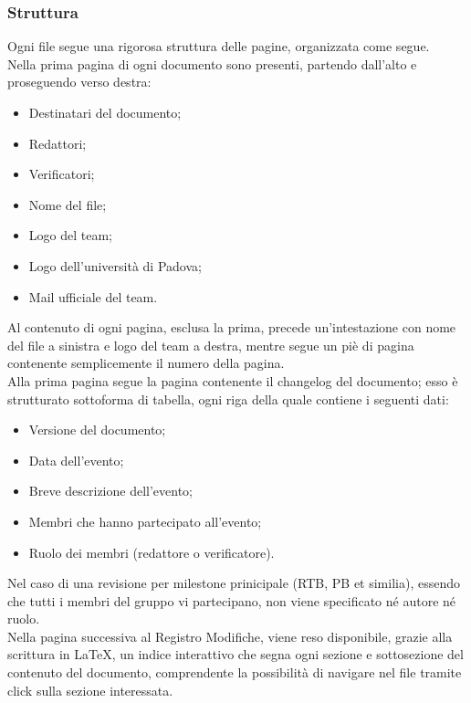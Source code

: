\subsubsection{Struttura}
Ogni file segue una rigorosa struttura delle pagine, organizzata come segue.
\\
Nella prima pagina di ogni documento sono presenti, partendo dall'alto e proseguendo verso destra:
\begin{itemize}
    \item Destinatari del documento;
    \item Redattori;
    \item Verificatori;
    \item Nome del file; 
    \item Logo del team;
    \item Logo dell'università di Padova;
    \item Mail ufficiale del team.
\end{itemize}
Al contenuto di ogni pagina, esclusa la prima, precede un'intestazione con nome del file a sinistra e logo del team a destra, mentre segue un piè di pagina contenente semplicemente il numero della pagina. 
\\
Alla prima pagina segue la pagina contenente il changelog del documento; esso è strutturato sottoforma di tabella, ogni riga della quale contiene i seguenti dati:
\begin{itemize}
    \item Versione del documento;
    \item Data dell'evento;
    \item Breve descrizione dell'evento;
    \item Membri che hanno partecipato all'evento;
    \item Ruolo dei membri (redattore o verificatore).
\end{itemize}
Nel caso di una revisione per milestone prinicipale (RTB, PB et similia), essendo che tutti i membri del gruppo vi partecipano, non viene specificato né autore né ruolo. 
\\
Nella pagina successiva al Registro Modifiche, viene reso disponibile, grazie alla scrittura in \LaTeX, un indice interattivo che segna ogni sezione e sottosezione del contenuto del documento, comprendente la possibilità di navigare nel file tramite click sulla sezione interessata.
\\

